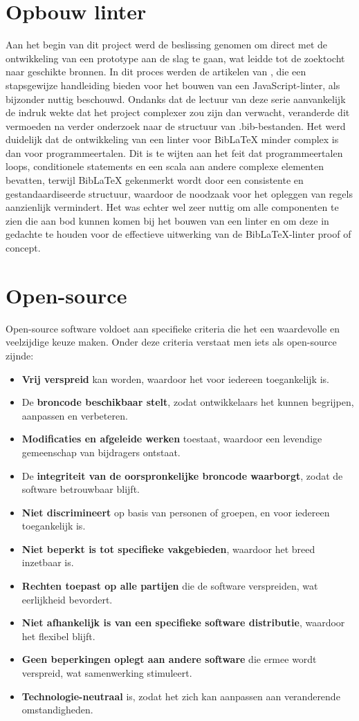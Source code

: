 \section{Opbouw linter}
Aan het begin van dit project werd de beslissing genomen om direct met de ontwikkeling van een prototype aan de slag te gaan, wat leidde tot de zoektocht naar geschikte bronnen. In dit proces werden de artikelen van \textcite{BorgesLate2021}, die een stapsgewijze handleiding bieden voor het bouwen van een JavaScript-linter, als bijzonder nuttig beschouwd. Ondanks dat de lectuur van deze serie aanvankelijk de indruk wekte dat het project complexer zou zijn dan verwacht, veranderde dit vermoeden na verder onderzoek naar de structuur van .bib-bestanden. Het werd duidelijk dat de ontwikkeling van een linter voor BibLaTeX minder complex is dan voor programmeertalen. Dit is te wijten aan het feit dat programmeertalen loops, conditionele statements en een scala aan andere complexe elementen bevatten, terwijl BibLaTeX gekenmerkt wordt door een consistente en gestandaardiseerde structuur, waardoor de noodzaak voor het opleggen van regels aanzienlijk vermindert. Het was echter wel zeer nuttig om alle componenten te zien die aan bod kunnen komen bij het bouwen van een linter en om deze in gedachte te houden voor de effectieve uitwerking van de BibLaTeX-linter proof of concept.

\section{Open-source}
Open-source software voldoet aan specifieke criteria die het een waardevolle en veelzijdige keuze maken. Onder deze criteria verstaat men iets als open-source zijnde:
\begin{itemize}
    \item \textbf{Vrij verspreid} kan worden, waardoor het voor iedereen toegankelijk is.
    \item De \textbf{broncode beschikbaar stelt}, zodat ontwikkelaars het kunnen begrijpen, aanpassen en verbeteren.
    \item \textbf{Modificaties en afgeleide werken} toestaat, waardoor een levendige gemeenschap van bijdragers ontstaat.
    \item De \textbf{integriteit van de oorspronkelijke broncode waarborgt}, zodat de software betrouwbaar blijft.
    \item \textbf{Niet discrimineert} op basis van personen of groepen, en voor iedereen toegankelijk is.
    \item \textbf{Niet beperkt is tot specifieke vakgebieden}, waardoor het breed inzetbaar is.
    \item \textbf{Rechten toepast op alle partijen} die de software verspreiden, wat eerlijkheid bevordert.
    \item \textbf{Niet afhankelijk is van een specifieke software distributie}, waardoor het flexibel blijft.
    \item \textbf{Geen beperkingen oplegt aan andere software} die ermee wordt verspreid, wat samenwerking stimuleert.
    \item \textbf{Technologie-neutraal} is, zodat het zich kan aanpassen aan veranderende omstandigheden.
\end{itemize}


